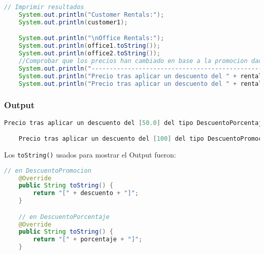 \begin{lstlisting}[style = javaNormal, language=Java]
    // Imprimir resultados
    System.out.println("Customer Rentals:");
    System.out.println(customer1);

    System.out.println("\nOffice Rentals:");
    System.out.println(office1.toString());
    System.out.println(office2.toString());
    //Comprobar que los precios han cambiado en base a la promocion dada en el sistema
    System.out.println("----------------------------------------------------------------");
    System.out.println("Precio tras aplicar un descuento del " + rental1.getDescuento().toString() + " del tipo " + rental1.getDescuento().getClass().getName() + ": " + rental1.getPrice() + "\n");
    System.out.println("Precio tras aplicar un descuento del " + rental2.getDescuento().toString() + " del tipo " + rental2.getDescuento().getClass().getName() + ": " + rental2.getPrice() + "\n");
\end{lstlisting}


\subsubsection*{Output}

\begin{lstlisting}[style = javaNormal, language=Java] 
    Precio tras aplicar un descuento del [50.0] del tipo DescuentoPorcentaje: 225

    Precio tras aplicar un descuento del [100] del tipo DescuentoPromocion: 400
\end{lstlisting}

\vspace{1cm}

\newpage

Los \texttt{toString()} usados para mostrar el Output fueron:

\begin{lstlisting}[style = javaEspecifico, language=Java] 
    // en DescuentoPromocion
    @Override
    public String toString() {
        return "[" + descuento + "]";
    }

    // en DescuentoPorcentaje
    @Override
    public String toString() {
        return "[" + porcentaje + "]";
    }
\end{lstlisting}